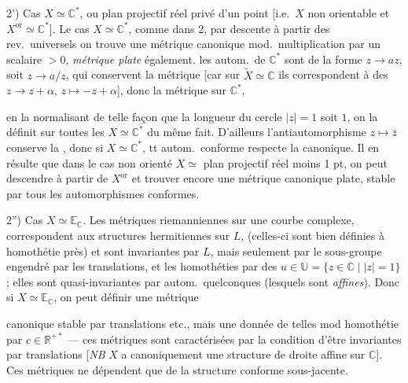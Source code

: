 \documentclass[11pt,a4paper]{article}
\begin{document}
2') Cas $X \simeq \mathbb{C}^{*}$, ou  plan projectif réel
privé d'un point [i.e.\ $X$ non orientable et
$X^{\mathrm{or}} \simeq \mathbb{C}^{*}$]. Le cas $X \simeq \mathbb{C}^{*}$,
comme dans 2,  par descente à partir
des rev.\ universels on trouve une métrique canonique mod.\ multiplication
par un scalaire $> 0$, \emph{métrique plate} également. \struck{\ill{}} les
autom.\ de $\mathbb{C}^{*}$ \struck{\ill{}}  sont de la
forme $z \to az$, soit $z \to a/z$, qui conservent la métrique [car sur
$\widetilde{X} \simeq \mathbb{C}$ ils correspondent à des $z \to z + \alpha$,
$z \mapsto -z + \alpha$], donc  la métrique sur
$\mathbb{C}^{*}$, 


\ill{} en la normalisant  de telle façon que la longueur du
cercle $|z| = 1$ soit $1$, on la définit sur toutes les
$X \simeq \mathbb{C}^{*}$ du même fait. D'ailleurs l'antiautomorphisme
$z \mapsto \bar{z}$ \struck{\ill{}} conserve la , donc si
$X \simeq \mathbb{C}^{*}$, tt autom.\ conforme respecte la 
canonique. Il en résulte que dans le cas non orienté
$X \simeq$ plan projectif réel moins 1 pt, on peut descendre à partir de
$X^{\mathrm{or}}$ et trouver encore une métrique canonique plate, stable par
tous les automorphismes conformes.

2'') Cas $X \simeq \mathbb{E}_{\mathbb{C}}$. Les métriques riemanniennes sur
une courbe \struck{\ill{}}  complexe, correspondent aux
structures hermitiennes  sur $L$, (celles-ci sont bien
définies à homothétie près) et sont invariantes par 
\struck{\ill{}}   $L$, mais seulement par le
sous-groupe engendré par les translations, et les 
homothéties par des $u \in \mathbb{U} = \{z \in \mathbb{C} \mid |z| = 1\}$ ;
elles sont quasi-invariantes par autom.\ quelconques (lesquels sont
\emph{affines}). Donc si $X \simeq \mathbb{E}_{\mathbb{C}}$, on peut définir
une \struck{\ill{}} métrique


canonique stable par translations etc., mais une donnée de telles mod
homothétie par $c \in \mathbb{R}^{+*}$ — ces métriques sont caractérisées
par la condition d'être invariantes par translations [\emph{NB} $X$ a
canoniquement une structure de droite affine sur $\mathbb{C}$]. Ces
métriques \struck{\ill{}} ne dépendent que de la structure conforme
sous-jacente.
\end{document}

